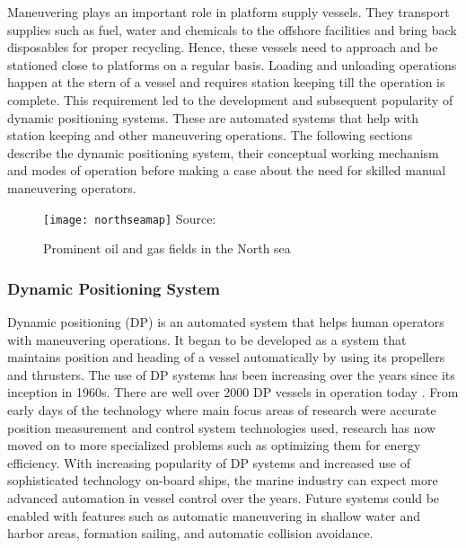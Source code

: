 Maneuvering plays an important role in platform supply vessels. They transport supplies such as fuel, water and chemicals to the offshore facilities and bring back disposables for proper recycling. Hence, these vessels need to approach and be stationed close to platforms on a regular basis. Loading and unloading operations happen at the stern of a vessel and requires station keeping till the operation is complete. This requirement led to the development and subsequent popularity of dynamic positioning systems. These are automated systems that help with station keeping and other maneuvering operations. The following sections describe the dynamic positioning system, their conceptual working mechanism and modes of operation before making a case about the need for skilled manual maneuvering operators.

\begin{figure}
	\centering
	\caption{Prominent oil and gas fields in the North sea}
	\texttt{[image: northseamap]}
	\label{fig:northseamap}
	\hbox{\small Source: }
\end{figure}

\subsubsection{Dynamic Positioning System}

Dynamic positioning (DP) is an automated system that helps human operators with maneuvering operations. It began to be developed as a system that maintains position and heading of a vessel automatically by using its propellers and thrusters. The use of DP systems has been increasing over the years since its inception in 1960s. There are well over 2000 DP vessels in operation today \parencite{sorensen2011survey}. From early days of the technology where main focus areas of research were accurate position measurement and control system technologies used, research has now moved on to more specialized problems such as optimizing them for energy efficiency. With increasing popularity of DP systems and increased use of sophisticated technology on-board ships, the marine industry can expect more advanced automation in vessel control over the years. Future systems could be enabled with features such as automatic maneuvering in shallow water and harbor areas, formation sailing, and automatic collision avoidance.

